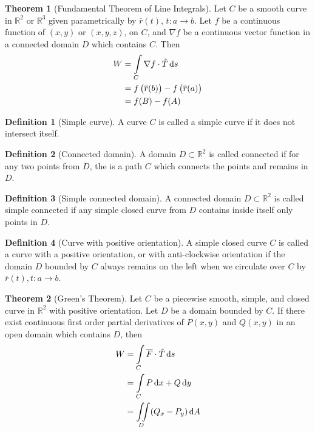 \documentclass[fleqn, a4paper, 12pt, twoside]{article}
\theoremstyle{definition}
\newtheorem{definition}{Definition}
\theoremstyle{theorem}
\newtheorem{theorem}{Theorem}
\begin{document}
{\begin{theorem}[Fundamental Theorem of Line Integrals]
	Let $C$ be a smooth curve in $\mathbb{R}^2$ or $\mathbb{R}^3$ given parametrically by $\overline{r}(t)$, $t : a \to b$.
	Let $f$ be a continuous function of $(x,y)$ or $(x,y,z)$, on $C$, and $\nabla f$ be a continuous vector function in a connected domain $D$ which contains $C$.
	Then
	\begin{align*}
		W & = \int\limits_{C} \nabla f \cdot \hat{T} \dif s                     \\
                  & = f\left( \overline{r}(b) \right) - f\left( \overline{r}(a) \right) \\
                  & = f(B) - f(A)
	\end{align*}
	\label{Fundamental_Theorem_of_Line_Integrals}
\end{theorem}

\begin{definition}[Simple curve]
	A curve $C$ is called a simple curve if it does not intersect itself.
\end{definition}

\begin{definition}[Connected domain]
	A domain $D \subset \mathbb{R}^2$ is called connected if for any two points from $D$, the is a path $C$ which connects the points and remains in $D$.
\end{definition}

\begin{definition}[Simple connected domain]
	A connected domain $D \subset \mathbb{R}^2$ is called simple connected if any simple closed curve from $D$ contains inside itself only points in $D$.
\end{definition}

\begin{definition}[Curve with positive orientation]
	A simple closed curve $C$ is called a curve with a positive orientation, or with anti-clockwise orientation if the domain $D$ bounded by $C$ always remains on the left when we circulate over $C$ by $\overline{r}(t), t : a \to b$.
\end{definition}

\begin{theorem}[Green's Theorem]
	Let $C$ be a piecewise smooth, simple, and closed curve in $\mathbb{R}^2$ with positive orientation.
	Let $D$ be a domain bounded by $C$.
	If there exist continuous first order partial derivatives of $P(x,y)$ and $Q(x,y)$ in an open domain which contains $D$, then
	\begin{align*}
		W & = \int\limits_{C} \overline{F} \cdot \hat{T} \dif s \\
                  & = \int\limits_{C} P \dif x + Q \dif y               \\
                  & = \iint\limits_{D} (Q_x - P_y) \dif A
	\end{align*}
	\label{Green's_Theorem}
\end{theorem}

}
\end{document}
